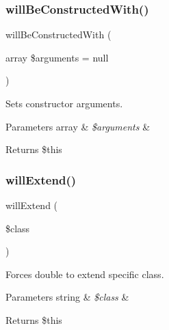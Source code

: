 \subsubsection{\texorpdfstring{will\+Be\+Constructed\+With()}{willBeConstructedWith()}}
{\footnotesize\ttfamily will\+Be\+Constructed\+With (\begin{DoxyParamCaption}\item[{array}]{\$arguments = {\ttfamily null} }\end{DoxyParamCaption})}

Sets constructor arguments.


\begin{DoxyParams}[1]{Parameters}
array & {\em \$arguments} & \\
\hline
\end{DoxyParams}
\begin{DoxyReturn}{Returns}
\$this 
\end{DoxyReturn}
\mbox{\label{class_prophecy_1_1_prophecy_1_1_object_prophecy_a0603a7d97406dde0bbb20200c38a1ae9}} 
\subsubsection{\texorpdfstring{will\+Extend()}{willExtend()}}
{\footnotesize\ttfamily will\+Extend (\begin{DoxyParamCaption}\item[{}]{\$class }\end{DoxyParamCaption})}

Forces double to extend specific class.


\begin{DoxyParams}[1]{Parameters}
string & {\em \$class} & \\
\hline
\end{DoxyParams}
\begin{DoxyReturn}{Returns}
\$this 
\end{DoxyReturn}
\mbox{\label{class_prophecy_1_1_prophecy_1_1_object_prophecy_af54922a80baf38e29dc5bc367a502ba4}} 
